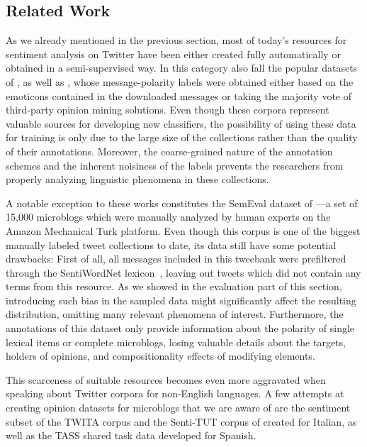 \subsection{Related Work}

As we already mentioned in the previous section, most of today's
resources for sentiment analysis on Twitter have been either created
fully automatically or obtained in a semi-supervised way.  In this
category also fall the popular datasets of \citet{Go:09},
\citet{Barbosa:10} as well as \citet{Pak:10}, whose message-polarity
labels were obtained either based on the emoticons contained in the
downloaded messages or taking the majority vote of third-party opinion
mining solutions.  Even though these corpora represent valuable
sources for developing new classifiers, the possibility of using these
data for training is only due to the large size of the collections
rather than the quality of their annotations.  Moreover, the
coarse-grained nature of the annotation schemes and the inherent
noisiness of the labels prevents the researchers from properly
analyzing linguistic phenomena in these collections.

A notable exception to these works constitutes the SemEval dataset of
\citet{Nakov:13}---a set of 15,000 microblogs which were manually
analyzed by human experts on the Amazon Mechanical Turk platform.
Even though this corpus is one of the biggest manually labeled tweet
collections to date, its data still have some potential drawbacks:
First of all, all messages included in this tweebank were prefiltered
through the SentiWordNet lexicon~\cite{Esuli:06b}, leaving out tweets
which did not contain any terms from this resource.  As we showed in
the evaluation part of this section, introducing such bias in the
sampled data might significantly affect the resulting distribution,
omitting many relevant phenomena of interest.  Furthermore, the
annotations of this dataset only provide information about the
polarity of single lexical items or complete microblogs, losing
valuable details about the targets, holders of opinions, and
compositionality effects of modifying elements.

This scarceness of suitable resources becomes even more aggravated
when speaking about Twitter corpora for non-English languages.  A few
attempts at creating opinion datasets for microblogs that we are aware
of are the sentiment subset of the TWITA corpus \cite{Basile:13} and
the Senti-TUT corpus of \citet{Bosco:13} created for Italian, as well
as the TASS shared task data \cite{Villena-Roman:13} developed for
Spanish.

